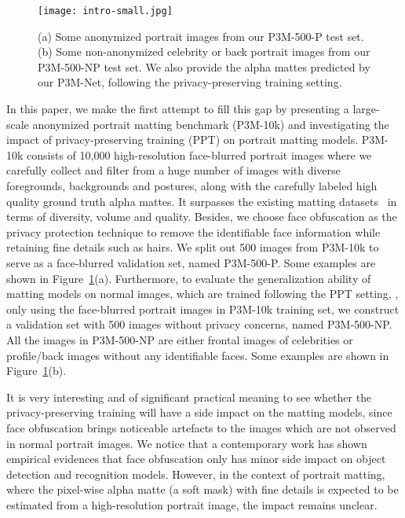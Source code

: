 \documentclass[sigconf]{acmart}
\begin{document}
\begin{figure}[t]
    \centering
    \texttt{[image: intro-small.jpg]}
    \caption{(a) Some anonymized portrait images from our P3M-500-P test set. (b) Some non-anonymized celebrity or back portrait images from our P3M-500-NP test set. We also provide the alpha mattes predicted by our P3M-Net, following the privacy-preserving training setting.}
    \label{fig:introduction}
\end{figure}

In this paper, we make the first attempt to fill this gap by presenting a large-scale anonymized portrait matting benchmark (P3M-10k) and investigating the impact of privacy-preserving training (PPT) on portrait matting models. P3M-10k consists of 10,000 high-resolution face-blurred portrait images where we carefully collect and filter from a huge number of images with diverse foregrounds, backgrounds and postures, along with the carefully labeled high quality ground truth alpha mattes. It surpasses the existing matting datasets~\cite{dapm,hatt,lf} in terms of diversity, volume and quality. Besides, we choose face obfuscation as the privacy protection technique to remove the identifiable face information while retaining fine details such as hairs. We split out 500 images from P3M-10k to serve as a face-blurred validation set, named P3M-500-P. Some examples are shown in Figure~\ref{fig:introduction}(a). Furthermore, to evaluate the generalization ability of matting models on normal images, which are trained following the PPT setting, , only using the face-blurred portrait images in P3M-10k training set, we construct a validation set with 500 images without privacy concerns, named P3M-500-NP. All the images in P3M-500-NP are either frontal images of celebrities or profile/back images without any identifiable faces. Some examples are shown in Figure~\ref{fig:introduction}(b).

It is very interesting and of significant practical meaning to see whether the privacy-preserving training will have a side impact on the matting models, since face obfuscation brings noticeable artefacts to the images which are not observed in normal portrait images. We notice that a contemporary work \cite{yang2021study} has shown empirical evidences that face obfuscation only has minor side impact on object detection and recognition models. However, in the context of portrait matting, where the pixel-wise alpha matte (a soft mask) with fine details is expected to be estimated from a high-resolution portrait image, the impact remains unclear.
\end{document}

